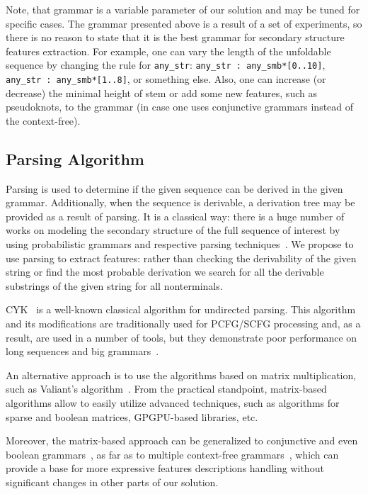 \documentclass[a4paper,twoside]{article}
\begin{document}
Note, that grammar is a variable parameter of our solution and may be tuned for specific cases.
The grammar presented above is a result of a set of experiments, so there is no reason to state that it is the best grammar for secondary structure features extraction.
For example, one can vary the length of the unfoldable sequence by changing the rule for \verb|any_str|: \verb|any_str : any_smb*[0..10]|, \verb|any_str : any_smb*[1..8]|, or something else.
Also, one can increase (or decrease) the minimal height of stem or add some new features, such as pseudoknots, to the grammar (in case one uses conjunctive grammars instead of the context-free).


\subsection{Parsing Algorithm}

\noindent Parsing is used to determine if the given sequence can be derived in the given grammar.
Additionally, when the sequence is derivable, a derivation tree may be provided as a result of parsing. 
It is a classical way: there is a huge number of works on modeling the secondary structure of the full sequence of interest by using probabilistic grammars and respective parsing techniques~\cite{knudsen2003pfold,Browny1993StochasticCG,Knudsen2005StochasticCG}.
We propose to use parsing to extract features: rather than checking the derivability of the given string or find the most probable derivation we search for all the derivable substrings of the given string for all nonterminals.

CYK~\cite{Younger1967RecognitionAP} is a well-known classical algorithm for undirected parsing. 
This algorithm and its modifications are traditionally used for PCFG/SCFG processing and, as a result, are used in a number of tools, but they demonstrate poor performance on long sequences and big grammars~\cite{Liu2005}.

An alternative approach is to use the algorithms based on matrix multiplication, such as Valiant's algorithm~\cite{Valiant:1975:GCR:1739932.1740048}.
From the practical standpoint, matrix-based algorithms allow to easily utilize advanced techniques, such as algorithms for sparse and boolean matrices, GPGPU-based libraries, etc.

Moreover, the matrix-based approach can be generalized to conjunctive and even boolean grammars~\cite{OKHOTIN2014101}, as far as to multiple context-free grammars~\cite{mcfgMatrices}, which can provide a base for more expressive features descriptions handling without significant changes in other parts of our solution.
\end{document}
